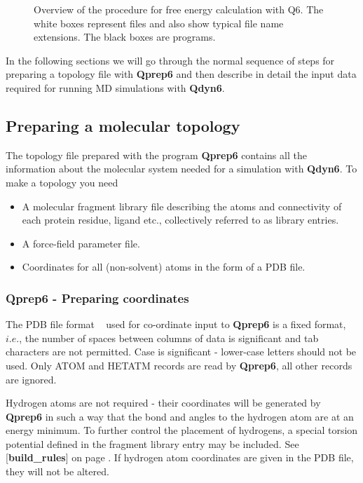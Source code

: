 \documentclass[a4paper,11pt]{article}
\newcommand{\dirfig}{./pictures}
\let\origcite\cite
\def\cite#1{\unskip~\origcite{#1}}
\begin{document}
\begin{figure}[h]
\begin{center}
\caption{Overview of the procedure for free energy calculation
with Q6. The white boxes represent files and also show typical file
name extensions. The black boxes are programs.}
\label{fig:overview}
\end{center}
\end{figure}

In the following sections we will go through the normal sequence
of steps for preparing a topology file with \textbf{Qprep6} and then
describe in detail the input data required for running MD
simulations with \textbf{Qdyn6}.

\subsection{Preparing a molecular topology} The topology file
prepared with the program \textbf{Qprep6} contains all the information about
the molecular system needed for a simulation with \textbf{Qdyn6}. To make a
topology you need

\begin{itemize}
\item A molecular fragment library file describing the atoms and connectivity
of each protein residue, ligand etc., collectively referred to as
library entries.
\item A force-field parameter file.
\item Coordinates for all (non-solvent) atoms in the form of a PDB file.
\end{itemize}

\subsubsection{\textbf{Qprep6} - Preparing coordinates} The PDB file format
\cite{pdb} used for co-ordinate input to \textbf{Qprep6} is a fixed format,
$i.e.$, the number of spaces between columns of data is significant
and tab characters are not permitted. Case is significant -
lower-case letters should not be used. Only ATOM and HETATM
records are read by \textbf{Qprep6}, all other records are ignored.

Hydrogen atoms are not required - their coordinates will be
generated by \textbf{Qprep6} in such a way that the bond and angles to the
hydrogen atom are at an energy minimum. To further control the
placement of hydrogens, a special torsion potential defined in the
fragment library entry may be included. See
[\textbf{build\_rules}] on page \pageref{tab:buildrules}. If
hydrogen atom coordinates are given in the PDB file, they will not
be altered.
\end{document}
